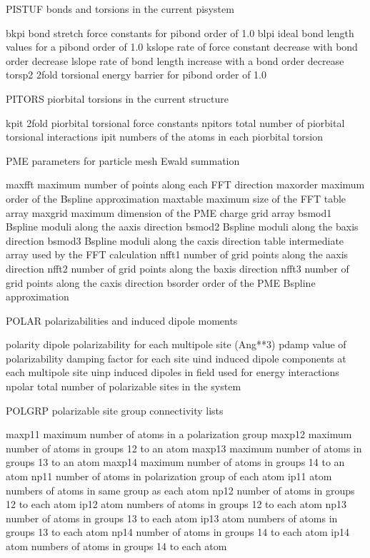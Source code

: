 \documentclass[letterpaper,11pt,english]{sphinxmanual}
\begin{document}
PISTUF  bonds and torsions in the current pisystem

bkpi    bond stretch force constants for pi\sphinxhyphen{}bond order of 1.0
blpi    ideal bond length values for a pi\sphinxhyphen{}bond order of 1.0
kslope  rate of force constant decrease with bond order decrease
lslope  rate of bond length increase with a bond order decrease
torsp2  2\sphinxhyphen{}fold torsional energy barrier for pi\sphinxhyphen{}bond order of 1.0

PITORS  pi\sphinxhyphen{}orbital torsions in the current structure

kpit    2\sphinxhyphen{}fold pi\sphinxhyphen{}orbital torsional force constants
npitors total number of pi\sphinxhyphen{}orbital torsional interactions
ipit    numbers of the atoms in each pi\sphinxhyphen{}orbital torsion

PME     parameters for particle mesh Ewald summation

maxfft  maximum number of points along each FFT direction
maxorder        maximum order of the B\sphinxhyphen{}spline approximation
maxtable        maximum size of the FFT table array
maxgrid maximum dimension of the PME charge grid array
bsmod1  B\sphinxhyphen{}spline moduli along the a\sphinxhyphen{}axis direction
bsmod2  B\sphinxhyphen{}spline moduli along the b\sphinxhyphen{}axis direction
bsmod3  B\sphinxhyphen{}spline moduli along the c\sphinxhyphen{}axis direction
table   intermediate array used by the FFT calculation
nfft1   number of grid points along the a\sphinxhyphen{}axis direction
nfft2   number of grid points along the b\sphinxhyphen{}axis direction
nfft3   number of grid points along the c\sphinxhyphen{}axis direction
bsorder order of the PME B\sphinxhyphen{}spline approximation

POLAR   polarizabilities and induced dipole moments

polarity        dipole polarizability for each multipole site (Ang**3)
pdamp   value of polarizability damping factor for each site
uind    induced dipole components at each multipole site
uinp    induced dipoles in field used for energy interactions
npolar  total number of polarizable sites in the system

POLGRP  polarizable site group connectivity lists

maxp11  maximum number of atoms in a polarization group
maxp12  maximum number of atoms in groups 1\sphinxhyphen{}2 to an atom
maxp13  maximum number of atoms in groups 1\sphinxhyphen{}3 to an atom
maxp14  maximum number of atoms in groups 1\sphinxhyphen{}4 to an atom
np11    number of atoms in polarization group of each atom
ip11    atom numbers of atoms in same group as each atom
np12    number of atoms in groups 1\sphinxhyphen{}2 to each atom
ip12    atom numbers of atoms in groups 1\sphinxhyphen{}2 to each atom
np13    number of atoms in groups 1\sphinxhyphen{}3 to each atom
ip13    atom numbers of atoms in groups 1\sphinxhyphen{}3 to each atom
np14    number of atoms in groups 1\sphinxhyphen{}4 to each atom
ip14    atom numbers of atoms in groups 1\sphinxhyphen{}4 to each atom
\end{document}
